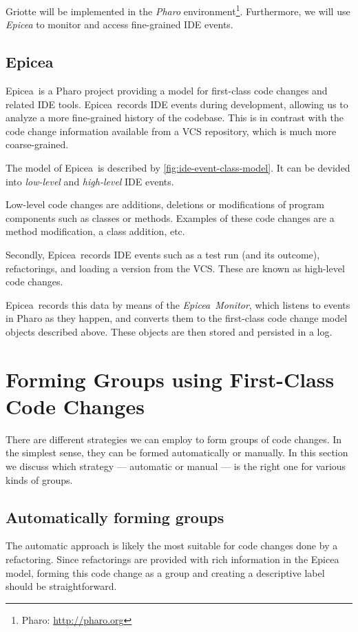 \documentclass[conference,a4paper]{IEEEtran}
\newcommand{\Ep}{Epicea}
\begin{document}
Griotte will be implemented in the \textit{Pharo}
environment\cite{Blac09a}\footnote{Pharo: \url{http://pharo.org}}.
Furthermore, we will use \textit{Epicea}\cite{Dias13a} to monitor and
access fine-grained IDE events.

\subsection{Epicea}
\label{sec:epicea}

\Ep\ is a Pharo project providing a model for first-class code changes
and related IDE tools. \Ep\ records IDE events during development,
allowing us to analyze a more fine-grained history of the
codebase. This is in contrast with the code change information
available from a VCS repository, which is much more coarse-grained.

The model of \Ep\ is described by \ref{fig:ide-event-class-model}. It
can be devided into \textit{low-level} and \textit{high-level} IDE
events.

Low-level code changes are additions, deletions or modifications of
program components such as classes or methods. Examples of these code
changes are a method modification, a class addition, etc.

Secondly, \Ep\ records IDE events such as a test run (and its
outcome), refactorings, and loading a version from the VCS. These are
known as high-level code changes.

\Ep\ records this data by means of the \textit{\Ep\ Monitor}, which
listens to events in Pharo as they happen, and converts them to the
first-class code change model objects described above. These objects
are then stored and persisted in a log.

\section{Forming Groups using First-Class Code Changes}
\label{sec:code-review-using}
There are different strategies we can employ to form groups of code
changes. In the simplest sense, they can be formed automatically or
manually. In this section we discuss which strategy --- automatic or
manual --- is the right one for various kinds of groups.

\subsection{Automatically forming groups}
\label{sec:autom-form-groups}
The automatic approach is likely the most suitable for code changes
done by a refactoring. Since refactorings are provided with rich
information in the Epicea model, forming this code change as a group
and creating a descriptive label should be straightforward.
\end{document}
